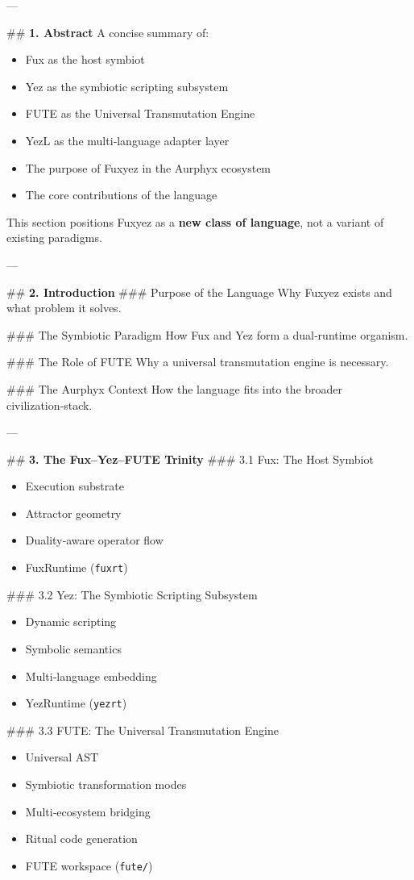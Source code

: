 \documentclass[12pt, a4paper]{book}
\begin{document}
---

\#\# \textbf{1. Abstract}
A concise summary of:
\begin{itemize}
  \item Fux as the host symbiot  
  \item Yez as the symbiotic scripting subsystem  
  \item FUTE as the Universal Transmutation Engine  
  \item YezL as the multi‑language adapter layer  
  \item The purpose of Fuxyez in the Aurphyx ecosystem  
  \item The core contributions of the language  
\end{itemize}

This section positions Fuxyez as a \textbf{new class of language}, not a variant of existing paradigms.

---

\#\# \textbf{2. Introduction}
\#\#\# Purpose of the Language  
Why Fuxyez exists and what problem it solves.

\#\#\# The Symbiotic Paradigm  
How Fux and Yez form a dual‑runtime organism.

\#\#\# The Role of FUTE  
Why a universal transmutation engine is necessary.

\#\#\# The Aurphyx Context  
How the language fits into the broader civilization‑stack.

---

\#\# \textbf{3. The Fux–Yez–FUTE Trinity}
\#\#\# 3.1 Fux: The Host Symbiot  
\begin{itemize}
  \item Execution substrate  
  \item Attractor geometry  
  \item Duality‑aware operator flow  
  \item FuxRuntime (\texttt{fuxrt})
\end{itemize}

\#\#\# 3.2 Yez: The Symbiotic Scripting Subsystem  
\begin{itemize}
  \item Dynamic scripting  
  \item Symbolic semantics  
  \item Multi‑language embedding  
  \item YezRuntime (\texttt{yezrt})
\end{itemize}

\#\#\# 3.3 FUTE: The Universal Transmutation Engine  
\begin{itemize}
  \item Universal AST  
  \item Symbiotic transformation modes  
  \item Multi‑ecosystem bridging  
  \item Ritual code generation  
  \item FUTE workspace (\texttt{fute/})
\end{itemize}
\end{document}

